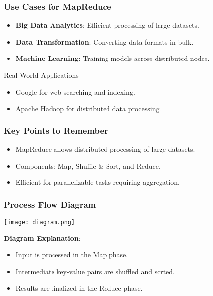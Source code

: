 \documentclass[aspectratio=169]{beamer}
\begin{document}
\begin{frame}
    \frametitle{Use Cases for MapReduce}
    \begin{itemize}
        \item \textbf{Big Data Analytics}: Efficient processing of large datasets.
        \item \textbf{Data Transformation}: Converting data formats in bulk.
        \item \textbf{Machine Learning}: Training models across distributed nodes.
    \end{itemize}

    \begin{block}{Real-World Applications}
        \begin{itemize}
            \item Google for web searching and indexing.
            \item Apache Hadoop for distributed data processing.
        \end{itemize}
    \end{block}
\end{frame}

\begin{frame}
    \frametitle{Key Points to Remember}
    \begin{itemize}
        \item MapReduce allows distributed processing of large datasets.
        \item Components: Map, Shuffle \& Sort, and Reduce.
        \item Efficient for parallelizable tasks requiring aggregation.
    \end{itemize}
\end{frame}

\begin{frame}
    \frametitle{Process Flow Diagram}
    \begin{center}
        \texttt{[image: diagram.png]} %
    \end{center}
    \textbf{Diagram Explanation}:
    \begin{itemize}
        \item Input is processed in the Map phase.
        \item Intermediate key-value pairs are shuffled and sorted.
        \item Results are finalized in the Reduce phase.
    \end{itemize}
\end{frame}
\end{document}
